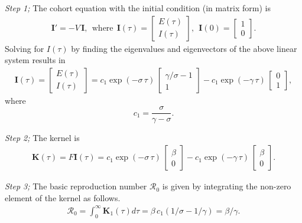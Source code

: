 \documentclass[12pt]{article}
\newcommand{\R}{\ensuremath{\mathcal{R}_0}}
\renewcommand{\vec}[1]{\ensuremath{\mathbf{#1}}} %
\theoremstyle{definition} %
\begin{document}
{\it Step 1;} The cohort equation with the initial condition (in matrix form) is 
\begin{align}
\vec I'=-V\,\vec I,~~ \text{where}~~ \vec I(\tau)=\left[ \begin {array}{c} E(\tau)\\I(\tau) \end {array} \right], ~~
\vec I(0)=\left[ \begin {array}{c} 1\\0 \end {array} \right].
\end{align}
Solving for $I(\tau)$ by finding the eigenvalues and eigenvectors of the above linear system results in
\begin{align}
\vec I(\tau) = \left[ \begin {array}{c} E(\tau)\\I(\tau) \end {array} \right] =
c_1 \exp(-\sigma\,\tau)\,\left[ \begin {array}{c} \gamma/\sigma-1\\1 \end {array} \right] 
-c_1 \exp(-\gamma\,\tau)\,\left[ \begin {array}{c} 0\\1 \end {array} \right],
\end{align}
where $$c_1=\frac{\sigma}{\gamma-\sigma}.$$

{\it Step 2;} The kernel is
\begin{align}
\vec K(\tau)= F \vec I(\tau)
= c_1 \exp(-\sigma\,\tau)\,\left[ \begin {array}{c} \beta\\0 \end {array} \right] 
 -c_1 \exp(-\gamma\,\tau)\,\left[ \begin {array}{c} \beta\\0 \end {array} \right].
\end{align}

{\it Step 3;} The basic reproduction number $\R$ is given by integrating the non-zero element of the kernel as follows.
\begin{align}
\R=\int_0^\infty \vec K_1(\tau) d\tau
=\beta\,c_1(1/\sigma-1/\gamma)
=\beta/\gamma.
\end{align}





\end{document}
